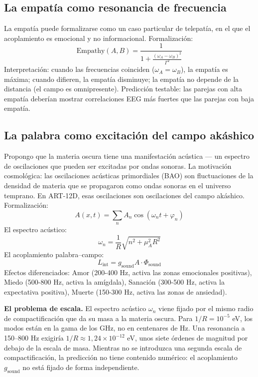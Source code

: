 \documentclass[11pt,a4paper]{article}
\begin{document}
\subsection{La empatía como resonancia de frecuencia}
La empatía puede formalizarse como un caso particular de telepatía, en el que el acoplamiento es emocional y no informacional. Formalización:
\begin{equation}
\text{Empathy}(A,B) = \frac{1}{1 + \frac{(\omega_A - \omega_B)^2}{\Gamma^2}}
\end{equation}
Interpretación: cuando las frecuencias coinciden ($\omega_A = \omega_B$), la empatía es máxima; cuando difieren, la empatía disminuye; la empatía no depende de la distancia (el campo es omnipresente). Predicción testable: las parejas con alta empatía deberían mostrar correlaciones EEG más fuertes que las parejas con baja empatía.

\subsection{La palabra como excitación del campo akáshico}
Propongo que la materia oscura tiene una manifestación acústica --- un espectro de oscilaciones que pueden ser excitadas por ondas sonoras. La motivación cosmológica: las oscilaciones acústicas primordiales (BAO) son fluctuaciones de la densidad de materia que se propagaron como ondas sonoras en el universo temprano. En ART-12D, esas oscilaciones son oscilaciones del campo akáshico. Formalización:
\begin{equation}
A(x,t) = \sum_n A_n \cos(\omega_n t + \varphi_n)
\end{equation}
El espectro acústico:
\begin{equation}
\omega_n = \frac{1}{R} \sqrt{n^2 + \mu_A^2 R^2}
\end{equation}
El acoplamiento palabra--campo:
\begin{equation}
L_{\text{int}} = g_{\text{sound}} A \cdot \Phi_{\text{sound}}
\end{equation}
Efectos diferenciados: Amor (200-400 Hz, activa las zonas emocionales positivas), Miedo (500-800 Hz, activa la amígdala), Sanación (300-500 Hz, activa la expectativa positiva), Muerte (150-300 Hz, activa las zonas de ansiedad).

\textbf{El problema de escala.} El espectro acústico $\omega_n$ viene fijado por el mismo radio de compactificación que da su masa a la materia oscura. Para $1/R = 10^{-5}$ eV, los modos están en la gama de los GHz, no en centenares de Hz. Una resonancia a 150--800 Hz exigiría $1/R \approx 1,24\times10^{-12}$ eV, unos siete órdenes de magnitud por debajo de la escala de masa. Mientras no se introduzca una segunda escala de compactificación, la predicción no tiene contenido numérico: el acoplamiento $g_{\text{sound}}$ no está fijado de forma independiente.
\end{document}

